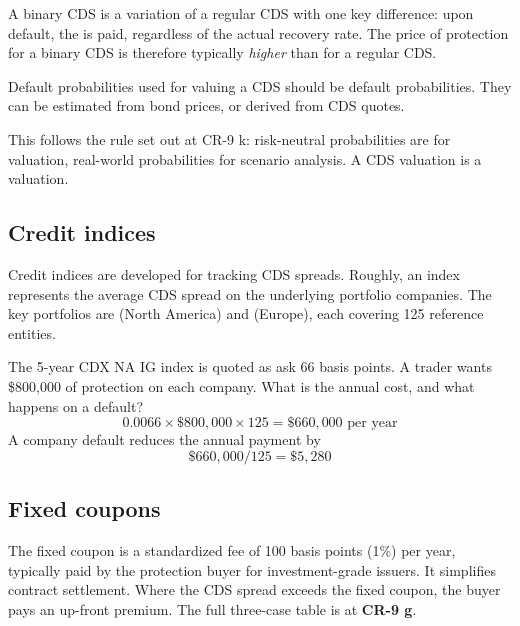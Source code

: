 A binary CDS is a variation of a regular CDS with one key difference: upon
default, the  is paid, regardless of the actual
recovery rate. The price of protection for a binary CDS is therefore typically
\emph{higher} than for a regular CDS.


\begin{crkeybox}
Default probabilities used for valuing a CDS should be 
default probabilities. They can be estimated from bond prices, or derived from
CDS quotes.
\end{crkeybox}

This follows the rule set out at CR-9 k: risk-neutral probabilities are for
valuation, real-world probabilities for scenario analysis. A CDS valuation is a
valuation.


\subsection*{Credit indices}

Credit indices are developed for tracking CDS spreads. Roughly, an index
represents the average CDS spread on the underlying portfolio companies. The key
portfolios are  (North America) and 
(Europe), each covering 125 reference entities.

\begin{crexbox}
The 5-year CDX NA IG index is quoted as ask 66 basis points. A trader wants
\$800,000 of protection on each company. What is the annual cost, and what happens
on a default?
\tcblower
\[ 0.0066 \times \$800{,}000 \times 125 = \$660{,}000 \text{ per year} \]
A company default reduces the annual payment by
\[ \$660{,}000 / 125 = \$5{,}280 \]
\end{crexbox}

\subsection*{Fixed coupons}

The fixed coupon is a standardized fee of 100 basis points (1\%) per year,
typically paid by the protection buyer for investment-grade issuers. It simplifies
contract settlement. Where the CDS spread exceeds the fixed coupon, the buyer pays
an up-front premium. The full three-case table is at \textbf{CR-9 g}.

